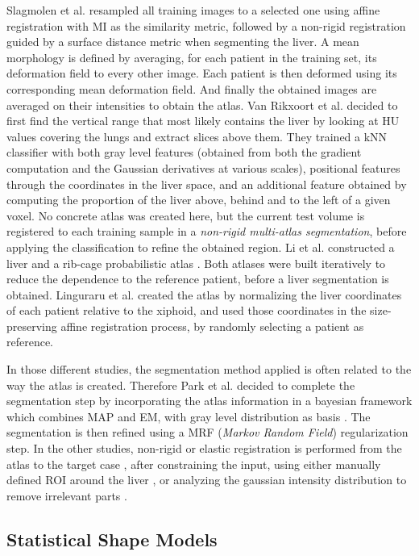 Slagmolen et al. \cite{Slagmolen2007} resampled all training images to a selected one using
affine registration with MI as the similarity metric, followed by a
non-rigid registration guided by a surface distance metric when segmenting the liver. A mean
morphology is defined by averaging, for each patient in the training
set, its deformation field to every other image. Each patient is then
deformed using its corresponding mean deformation field. And finally the
obtained images are averaged on their intensities to obtain the atlas.
Van Rikxoort et al. \cite{Rikxoort2007} decided to first find the vertical range that most likely
contains the liver by looking at HU values covering the lungs and
extract slices above them. They trained a kNN classifier with both gray
level features (obtained from both the gradient computation and the
Gaussian derivatives at various scales), positional features through the
coordinates in the liver space, and an additional feature obtained by
computing the proportion of the liver above, behind and to the left of a
given voxel. No concrete atlas was created here, but the current test
volume is registered to each training sample in a \emph{non-rigid
	multi-atlas segmentation}, before applying the classification to refine
the obtained region.
Li et al. \cite{Li2010} constructed a liver and a rib-cage probabilistic atlas . Both
atlases were built iteratively to reduce the dependence to the reference
patient, before a liver segmentation is obtained. 
Linguraru et al. \cite{Linguraru2009} created the atlas by normalizing the liver coordinates of
each patient relative to the xiphoid, and used those coordinates in the
size-preserving affine registration process, by randomly selecting a
patient as reference.

In those different studies, the segmentation method applied is often
related to the way the atlas is created. Therefore Park et al. decided to complete the segmentation step by incorporating the
atlas information in a bayesian framework which combines MAP and EM,
with gray level distribution as basis \cite{Park2003}. The segmentation is then refined
using a MRF (\emph{Markov Random Field}) regularization step. In the
other studies, non-rigid or elastic registration is performed from the
atlas to the target case \cite{Slagmolen2007, Linguraru2009, Li2010}, after constraining the input, using either manually defined
ROI around the liver \cite{Slagmolen2007}, or analyzing the gaussian intensity distribution to
remove irrelevant parts \cite{Li2010}.

\subsection{Statistical Shape Models}

